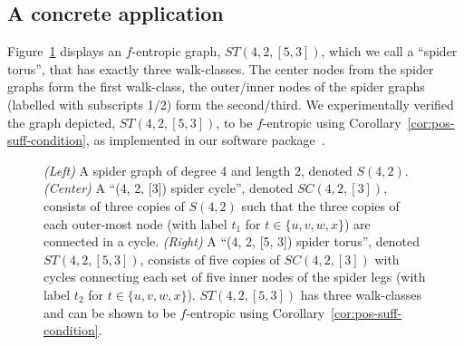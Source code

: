 \subsection{A concrete application}\label{sec:spider-torus}

Figure~\ref{fig:spidertorus} displays an $f$-entropic graph, $ST(4,2,[5,3])$, which we call a ``spider torus'', that has exactly three walk-classes.
The center nodes from the spider graphs form the first walk-class, the outer/inner nodes of the spider graphs (labelled with subscripts 1/2) form the second/third. We experimentally verified the graph depicted, $ST(4,2,[5,3])$, to be $f$-entropic using Corollary~\ref{cor:pos-suff-condition}, as implemented in our software package~\cite{spiderdonuts_v1.0.0}.

\begin{figure}[!ht]
  \centering
  \resizebox{0.9\linewidth}{!}{}
  \caption{
      \emph{(Left)} A spider graph of degree 4 and length 2, denoted $S(4,2)$.
      \emph{(Center)} A ``(4, 2, [3]) spider cycle'', denoted $SC(4,2,[3])$, consists of three copies of $S(4,2)$ such that the three copies of each outer-most node (with label $t_1$ for $t \in \{u,v,w,x\}$)  are connected in a cycle.
      \emph{(Right)} A ``(4, 2, [5, 3]) spider torus'', denoted $ST(4,2,[5,3])$, consists of five copies of $SC(4,2,[3])$ with cycles connecting each set of five inner nodes of the spider legs (with label $t_2$ for $t \in \{u,v,w,x\}$).  $ST(4,2,[5,3])$ has three walk-classes and can be shown to be $f$-entropic using Corollary~\ref{cor:pos-suff-condition}.
  }\label{fig:spidertorus}
\end{figure}
